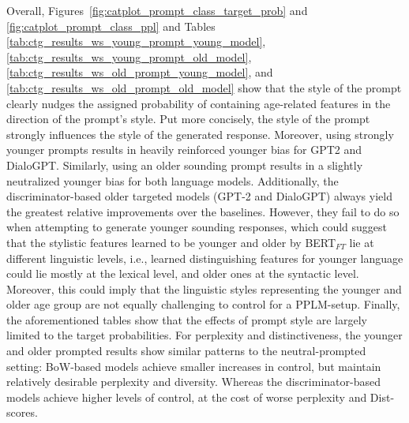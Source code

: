Overall, Figures~\ref{fig:catplot_prompt_class_target_prob} and \ref{fig:catplot_prompt_class_ppl} and Tables \ref{tab:ctg_results_ws_young_prompt_young_model}, \ref{tab:ctg_results_ws_young_prompt_old_model}, \ref{tab:ctg_results_ws_old_prompt_young_model}, and \ref{tab:ctg_results_ws_old_prompt_old_model} show that the style of the prompt clearly nudges the assigned probability of containing age-related features in the direction of the prompt's style. Put more concisely, the style of the prompt strongly influences the style of the generated response. Moreover, using strongly younger prompts results in heavily reinforced younger bias for GPT2 and DialoGPT. Similarly, using an older sounding prompt results in a slightly neutralized younger bias for both language models. Additionally, the discriminator-based older targeted models (GPT-2 and DialoGPT) always yield the greatest relative improvements over the baselines. However, they fail to do so when attempting to generate younger sounding responses, which could suggest that the stylistic features learned to be younger and older by BERT$_{FT}$ lie at different linguistic levels, i.e., learned distinguishing features for younger language could lie mostly at the lexical level, and older ones at the syntactic level. Moreover, this could imply that the linguistic styles representing the younger and older age group are not equally challenging to control for a PPLM-setup. Finally, the aforementioned tables show that the effects of prompt style are largely limited to the target probabilities. For perplexity and distinctiveness, the younger and older prompted results show similar patterns to the neutral-prompted setting: BoW-based models achieve smaller increases in control, but maintain relatively desirable perplexity and diversity. Whereas the discriminator-based models achieve higher levels of control, at the cost of worse perplexity and Dist-scores.


